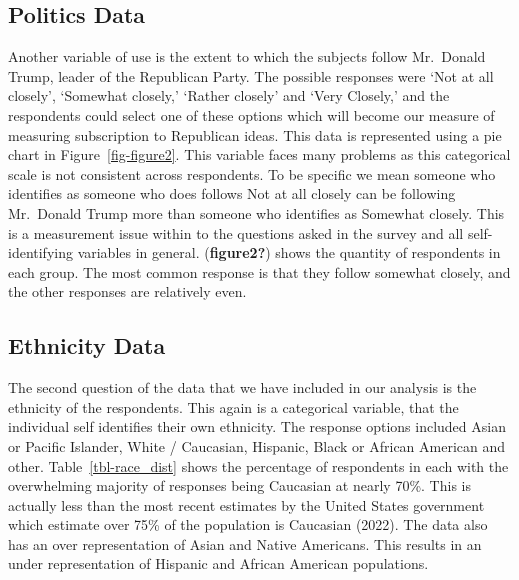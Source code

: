 \documentclass[
  letterpaper,
  DIV=11,
  numbers=noendperiod]{scrartcl}
\begin{document}
\subsection{Politics Data}\label{sec-pol_data}

Another variable of use is the extent to which the subjects follow
Mr.~Donald Trump, leader of the Republican Party. The possible responses
were `Not at all closely', `Somewhat closely,' `Rather closely' and
`Very Closely,' and the respondents could select one of these options
which will become our measure of measuring subscription to Republican
ideas. This data is represented using a pie chart in
Figure~\ref{fig-figure2}. This variable faces many problems as this
categorical scale is not consistent across respondents. To be specific
we mean someone who identifies as someone who does follows Not at all
closely can be following Mr.~Donald Trump more than someone who
identifies as Somewhat closely. This is a measurement issue within to
the questions asked in the survey and all self-identifying variables in
general. (\textbf{figure2?}) shows the quantity of respondents in each
group. The most common response is that they follow somewhat closely,
and the other responses are relatively even.

\subsection{Ethnicity Data}\label{sec-race_data}

The second question of the data that we have included in our analysis is
the ethnicity of the respondents. This again is a categorical variable,
that the individual self identifies their own ethnicity. The response
options included Asian or Pacific Islander, White / Caucasian, Hispanic,
Black or African American and other. Table~\ref{tbl-race_dist} shows the
percentage of respondents in each with the overwhelming majority of
responses being Caucasian at nearly 70\%. This is actually less than the
most recent estimates by the United States government which estimate
over 75\% of the population is Caucasian (2022). The data also has an
over representation of Asian and Native Americans. This results in an
under representation of Hispanic and African American populations.
\end{document}
